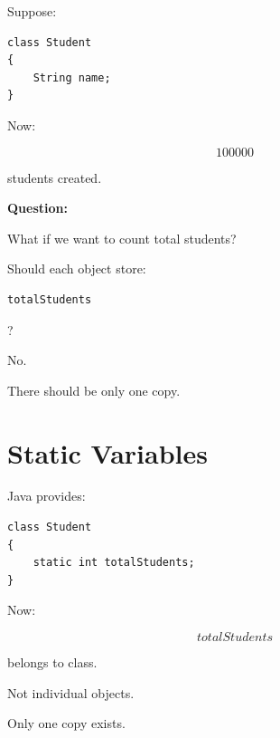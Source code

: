 \documentclass[11pt,a4paper]{book}
\begin{document}
Suppose:

\begin{verbatim}
class Student
{
    String name;
}
\end{verbatim}


Now:

\[
100000
\]

students created.


\textbf{Question:}

What if we want to count total students?


Should each object store:

\begin{verbatim}
totalStudents
\end{verbatim}

?

No.


There should be only one copy.


\section{Static Variables}

Java provides:

\begin{verbatim}
class Student
{
    static int totalStudents;
}
\end{verbatim}


Now:

\[
totalStudents
\]

belongs to class.


Not individual objects.


Only one copy exists.

\end{document}
